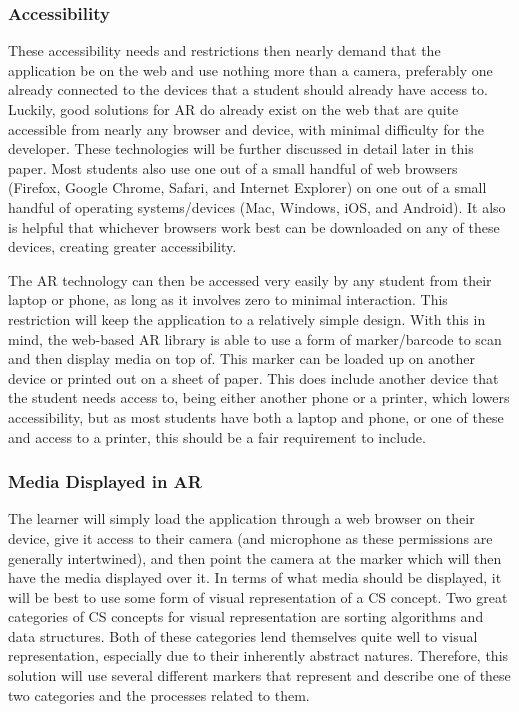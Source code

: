 \documentclass[sigconf]{acmart}
\begin{document}
\subsubsection{Accessibility}
These accessibility needs and restrictions then nearly demand that the application be on the web and use nothing more than a camera, preferably one already connected to the devices that a student should already have access to. Luckily, good solutions for AR do already exist on the web that are quite accessible from nearly any browser and device, with minimal difficulty for the developer. These technologies will be further discussed in detail later in this paper. Most students also use one out of a small handful of web browsers (Firefox, Google Chrome, Safari, and Internet Explorer) on one out of a small handful of operating systems/devices (Mac, Windows, iOS, and Android). It also is helpful that whichever browsers work best can be downloaded on any of these devices, creating greater accessibility.

The AR technology can then be accessed very easily by any student from their laptop or phone, as long as it involves zero to minimal interaction. This restriction will keep the application to a relatively simple design. With this in mind, the web-based AR library is able to use a form of marker/barcode to scan and then display media on top of. This marker can be loaded up on another device or printed out on a sheet of paper. This does include another device that the student needs access to, being either another phone or a printer, which lowers accessibility, but as most students have both a laptop and phone, or one of these and access to a printer, this should be a fair requirement to include.

\subsubsection{Media Displayed in AR}
The learner will simply load the application through a web browser on their device, give it access to their camera (and microphone as these permissions are generally intertwined), and then point the camera at the marker which will then have the media displayed over it. In terms of what media should be displayed, it will be best to use some form of visual representation of a CS concept. Two great categories of CS concepts for visual representation are sorting algorithms and data structures. Both of these categories lend themselves quite well to visual representation, especially due to their inherently abstract natures. Therefore, this solution will use several different markers that represent and describe one of these two categories and the processes related to them.
\end{document}
